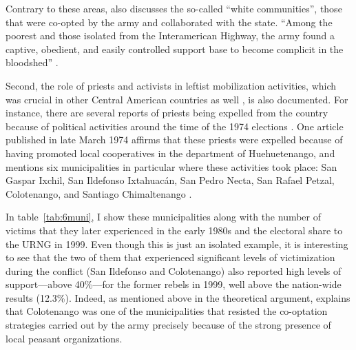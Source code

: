 \documentclass[12pt, notitlepage]{article}
\begin{document}
Contrary to these areas, \citet{Esparza:2018uw} also discusses the so-called ``white communities'', those that were co-opted by the army and collaborated with the state.
``Among the poorest and those isolated from the Interamerican Highway, the army found a captive, obedient, and easily controlled support base to become complicit in the bloodshed'' \citet[138]{Esparza:2018uw}.


Second, the role of priests and activists in leftist mobilization activities, which was crucial in other Central American countries as well \citep{Wood:2003aa}, is also documented.
For instance, there are several reports of priests being expelled from the country because of political activities around the time of the 1974 elections \citep{Imparcial:1974ab, Imparcial:1974uz}.
One article published in late March 1974 affirms that these priests were expelled because of having promoted local cooperatives in the department of Huehuetenango, and mentions six municipalities in particular where these activities took place: San Gaspar Ixchil, San Ildefonso Ixtahuacán, San Pedro Necta, San Rafael Petzal, Colotenango, and Santiago Chimaltenango \citep{Imparcial:1974aa}.

In table~\ref{tab:6muni}, I show these municipalities along with the number of victims that they later experienced in the early 1980s and the electoral share to the URNG in 1999.
Even though this is just an isolated example, it is interesting to see that the two of them that experienced significant levels of victimization during the conflict (San Ildefonso and Colotenango) also reported high levels of support---above 40\%---for the former rebels in 1999, well above the nation-wide results (12.3\%).
Indeed, as mentioned above in the theoretical argument, \citet[223--226]{Kobrak:2013aa} explains that Colotenango was one of the municipalities that resisted the co-optation strategies carried out by the army precisely because of the strong presence of local peasant organizations.
\end{document}
